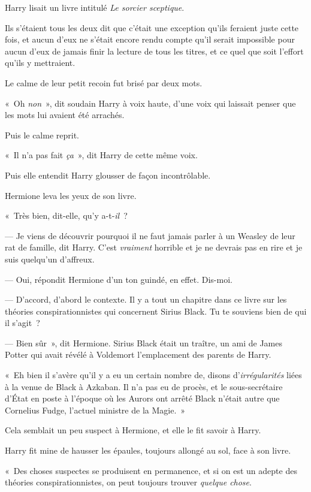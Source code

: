 Harry lisait un livre intitulé \emph{Le sorcier sceptique}.

Ils s'étaient tous les deux dit que c'était une exception qu'ils feraient juste cette fois, et aucun d'eux ne s'était encore rendu compte qu'il serait impossible pour aucun d'eux de jamais finir la lecture de tous les titres, et ce quel que soit l'effort qu'ils y mettraient.

Le calme de leur petit recoin fut brisé par deux mots.

«~Oh \emph{non}~», dit soudain Harry à voix haute, d'une voix qui laissait penser que les mots lui avaient été arrachés.

Puis le calme reprit.

«~Il n'a pas fait \emph{ça}~», dit Harry de cette même voix.

Puis elle entendit Harry glousser de façon incontrôlable.

Hermione leva les yeux de son livre.

«~Très bien, dit-elle, qu'y a-t-\emph{il}~?

--- Je viens de découvrir pourquoi il ne faut jamais parler à un Weasley de leur rat de famille, dit Harry. C'est \emph{vraiment} horrible et je ne devrais pas en rire et je suis quelqu'un d'affreux.

--- Oui, répondit Hermione d'un ton guindé, en effet. Dis-moi.

--- D'accord, d'abord le contexte. Il y a tout un chapitre dans ce livre sur les théories conspirationnistes qui concernent Sirius Black. Tu te souviens bien de qui il s'agit~?

--- Bien sûr~», dit Hermione. Sirius Black était un traître, un ami de James Potter qui avait révélé à Voldemort l'emplacement des parents de Harry.

«~Eh bien il s'avère qu'il y a eu un certain nombre de, disons d'\emph{irrégularités} liées à la venue de Black à Azkaban. Il n'a pas eu de procès, et le sous-secrétaire d'État en poste à l'époque où les Aurors ont arrêté Black n'était autre que Cornelius Fudge, l'actuel ministre de la Magie.~»

Cela semblait un peu suspect à Hermione, et elle le fit savoir à Harry.

Harry fit mine de hausser les épaules, toujours allongé au sol, face à son livre.

«~Des choses suspectes se produisent en permanence, et si on est un adepte des théories conspirationnistes, on peut toujours trouver \emph{quelque chose}.

